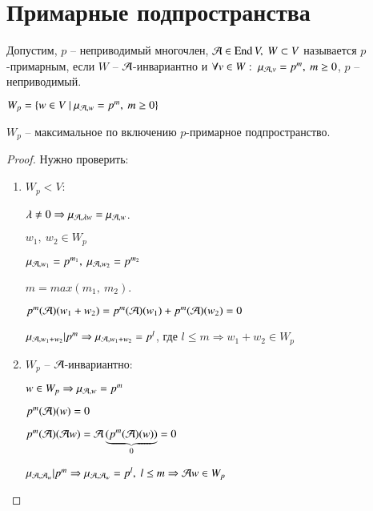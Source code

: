 \documentclass[main]{subfiles}
\begin{document}
\chapter{Примарные подпространства}

\begin{definition} 
    Допустим, $p$ -- неприводимый многочлен, $\mca \in \End V, \ W \subset V$ называется $p$-примарным, если $W$ -- $\mathcal{A}$-инвариантно
    и $\forall v \in W: \ \mu_{\mathcal{A}, v} = p^m, \ m \geq 0$, $p$ -- неприводимый.

    \begin{center}$W_p = \{w \in V \ | \ \mu_{\mathcal{A}, w} = p^m, \ m \geq 0\}$ \end{center}
\end{definition}

\begin{proposition}
    $W_p$ -- максимальное по включению $p$-примарное подпространство.
\end{proposition}

\begin{proof}
    Нужно проверить:
    \begin{enumerate}
        \item $W_p < V$:
              \begin{center}
                  $\lambda \neq 0 \Rightarrow \mu_{\mathcal{A}, \lambda w} = \mu_{\mathcal{A}, w}$.

                  $w_1, \ w_2 \in W_p$

                  $\mu_{\mathcal{A}, w_1} = p^{m_1}, \ \mu_{\mathcal{A}, w_2} = p^{m_2}$

                  $ m = max(m_1, \ m_2)$.

                  $p^m(\mathcal{A})(w_1+w_2) = p^m(\mathcal{A})(w_1)+ p^m(\mathcal{A})(w_2) = 0 $

                  $\mu_{\mathcal{A}, w_1 +w_2} | p^m \Rightarrow \mu_{\mathcal{A}, w_1 +w_2} = p^l$, где $l \leq m \Rightarrow w_1+w_2 \in W_p$
              \end{center}

        \item $W_p$ -- $\mathcal{A}$-инвариантно:
              \begin{center}
                  $w \in W_p \Rightarrow \mu_{\mathcal{A}, w} = p^m$

                  $p^m(\mathcal{A})(w) = 0$

                  $p^m(\mathcal{A})(\mathcal{A} w) = \mathcal{A}\underbrace{(p^m(\mathcal{A})(w))}_{0} = 0 $

                  $ \mu_{\mathcal{A}, \mathcal{A}_w} | p^m \Rightarrow \mu_{\mathcal{A}, \mathcal{A}_w} = p^l, \ l \leq m \Rightarrow \mathcal{A} w \in W_p$
              \end{center}

    \end{enumerate}
\end{proof}
\end{document}
